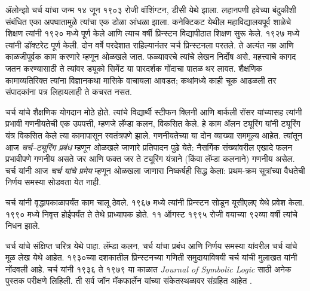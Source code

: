 \documentclass[../../../include/open-logic-section]{subfiles}
\begin{document}



ॲलोन्झो चर्च यांचा जन्म १४ जून १९०३ रोजी वॉशिंग्टन, डीसी येथे झाला. लहानपणी हवेच्या बंदुकीशी संबंधित एका अपघातामुळे त्यांचा एक डोळा आंधळा झाला. कनेक्टिकट येथील महाविद्यालयपूर्व शाळेचे शिक्षण त्यांनी १९२० मध्ये पूर्ण केले आणि त्याच वर्षी प्रिन्स्टन विद्यापीठात शिक्षण सुरू केले. १९२७ मध्ये त्यांनी डॉक्टरेट पूर्ण केली. दोन वर्षे परदेशात राहिल्यानंतर चर्च प्रिन्स्टनला परतले. ते अत्यंत नम्र आणि काळजीपूर्वक काम करणारे म्हणून ओळखले जात. फळ्यावरचे त्यांचे लेखन निर्दोष असे. महत्त्वाचे कागद जतन करण्यासाठी ते त्यांवर ड्यूको सिमेंट या पारदर्शक गोंदाचा पातळ थर लावत. शैक्षणिक कामाव्यतिरिक्त त्यांना विज्ञानकथा मासिके वाचायला आवडत; कथांमध्ये काही चूक आढळली तर संपादकांना पत्र लिहायलाही ते कचरत नसत.

चर्च यांचे शैक्षणिक योगदान मोठे होते. त्यांचे विद्यार्थी स्टीफन क्लिनी आणि बार्कली रॉसर यांच्यासह त्यांनी प्रभावी गणनीयतेची एक उपपत्ती, म्हणजे लॅम्डा कलन, विकसित केले. हे काम ॲलन ट्यूरिंग यांनी ट्यूरिंग यंत्र विकसित केले त्या कामापासून स्वतंत्रपणे झाले. गणनीयतेच्या या दोन व्याख्या सममूल्य आहेत. त्यांतून आज \emph{चर्च–ट्यूरिंग प्रबंध} म्हणून ओळखले जाणारे प्रतिपादन पुढे येते: नैसर्गिक संख्यांवरील एखादे फलन प्रभावीपणे गणनीय असते जर आणि फक्त जर ते ट्यूरिंग यंत्राने (किंवा लॅम्डा कलनाने) गणनीय असेल. चर्च यांनी आज \emph{चर्च यांचे प्रमेय} म्हणून ओळखला जाणारा निष्कर्षही सिद्ध केला: प्रथम-क्रम सूत्रांच्या वैधतेची निर्णय समस्या सोडवता येत नाही.

चर्च यांनी वृद्धापकाळापर्यंत काम चालू ठेवले. १९६७ मध्ये त्यांनी प्रिन्स्टन सोडून यूसीएलए येथे प्रवेश केला. १९९० मध्ये निवृत्त होईपर्यंत ते तेथे प्राध्यापक होते. ११ ऑगस्ट १९९५ रोजी वयाच्या ९२व्या वर्षी त्यांचे निधन झाले.

\begin{reading}
चर्च यांचे संक्षिप्त चरित्र \citet{EndertonND} येथे पाहा. लॅम्डा कलन, चर्च यांचा प्रबंध आणि निर्णय समस्या यांवरील चर्च यांचे मूळ लेख \citet{Church1936,Church1936a} येथे आहेत. १९३०च्या दशकातील प्रिन्स्टनच्या गणिती समुदायाविषयी चर्च यांची मुलाखत \citet{Aspray1984} यांनी नोंदवली आहे. चर्च यांनी १९३६ ते १९७९ या काळात \emph{Journal of Symbolic Logic} साठी अनेक पुस्तक परीक्षणे लिहिली. ती सर्व जॉन मॅकफार्लेन यांच्या संकेतस्थळावर संग्रहित आहेत \citep{MacFarlane2015}.
\end{reading} 
\end{document}
